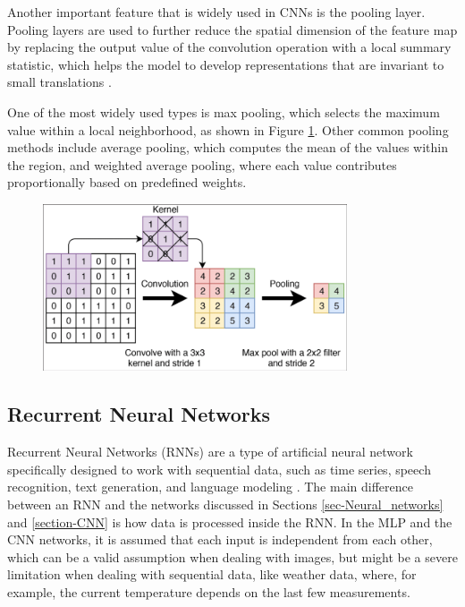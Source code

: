 Another important feature that is widely used in CNNs is the pooling layer. Pooling layers are used to further reduce the spatial dimension of the feature map by replacing the output value of the convolution operation with a local summary statistic, which helps the model to develop representations that are invariant to small translations \cite{Goodfellow_Bengio_Courville_2018}. 

One of the most widely used types is max pooling, which selects the maximum value within a local neighborhood, as shown in Figure \ref{fig:pooling-example}. Other common pooling methods include average pooling, which computes the mean of the values within the region, and weighted average pooling, where each value contributes proportionally based on predefined weights.

\begin{figure}[H]
    \centering
    \includegraphics[width=9cm]{Cap2_LitReview/model_basics/Convolutional_NN/Schematic-representation-of-a-convolution-and-pooling-layer-in-a-CNN.png}
    \caption{\cite{Verschoof-van}}
    \label{fig:pooling-example}
\end{figure}

\subsection{Recurrent Neural Networks} \label{section-RNN}

Recurrent Neural Networks (RNNs) are a type of artificial neural network specifically designed to work with sequential data, such as time series, speech recognition, text generation, and language modeling \cite{schmidt2019recurrentneuralnetworksrnns,fang-wei,Alzubaidi_Zhang_Humaidi_Al_Dujaili_Duan_Al_Shamma_Santamaria_Fadhel_Al_Amidie_Farhan_2021}. The main difference between an RNN and the networks discussed in Sections \ref{sec-Neural_networks} and \ref{section-CNN} is how data is processed inside the RNN. In the MLP and the CNN networks, it is assumed that each input is independent from each other, which can be a valid assumption when dealing with images, but might be a severe limitation when dealing with sequential data, like weather data, where, for example, the current temperature depends on the last few measurements.

